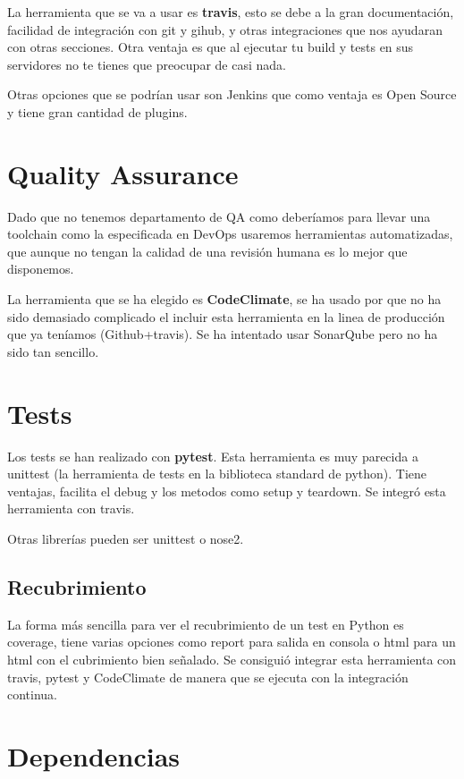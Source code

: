 La herramienta que se va a usar es \textbf{travis}, esto se debe a la gran documentación, facilidad de integración con git y gihub, y otras integraciones que nos ayudaran con otras secciones. Otra ventaja es que al ejecutar tu build y tests en sus servidores no te tienes que preocupar de casi nada.

Otras opciones que se podrían usar son Jenkins que como ventaja es Open Source y tiene gran cantidad de plugins.


\section{Quality Assurance}

Dado que no tenemos departamento de QA como deberíamos para llevar una toolchain como la especificada en DevOps usaremos herramientas automatizadas, que aunque no tengan la calidad de una revisión humana es lo mejor que disponemos. 

La herramienta que se ha elegido es \textbf{CodeClimate}, se ha usado por que no ha sido demasiado complicado el incluir esta herramienta en la linea de producción que ya teníamos (Github+travis). Se ha intentado usar SonarQube pero no ha sido tan sencillo.


\section{Tests}

Los tests se han realizado con \textbf{pytest}. Esta herramienta es muy parecida a unittest (la herramienta de tests en la biblioteca standard de python). Tiene ventajas, facilita el debug y los metodos como setup y teardown. Se integró esta herramienta con travis.

Otras librerías pueden ser unittest o nose2.


\subsection{Recubrimiento}

La forma más sencilla para ver el recubrimiento de un test en Python es coverage, tiene varias opciones como report para salida en consola o html para un html con el cubrimiento bien señalado. Se consiguió integrar esta herramienta con travis, pytest y CodeClimate de manera que se ejecuta con la integración continua.


\section{Dependencias}

